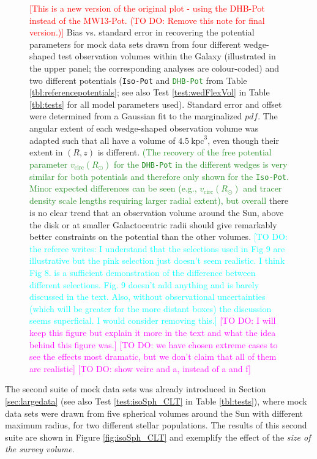 \documentclass[iop,revtex4]{emulateapj}
\newcommand{\pdf}{\ensuremath{pdf}}
\newcommand{\HW}[1]{\textcolor{Cyan}{#1}}
\newcommand{\NEW}[1]{\textcolor{ForestGreen}{#1}}
\newcommand{\Wilma}[1]{\textcolor{Magenta}{#1}}
\newcommand{\NOTE}[1]{\textcolor{Red}{#1}}
\newcommand{\OLD}[1]{}
\begin{document}
\begin{figure}[!htbp]
\caption{\NOTE{[This is a new version of the original plot - using the DHB-Pot instead of the MW13-Pot. (TO DO: Remove this note for final version.)]} Bias vs. standard error in recovering the potential parameters for mock data sets drawn from four different wedge-shaped test observation volumes within the Galaxy (illustrated in the upper panel; the corresponding analyses are colour-coded) and two different potentials (\texttt{Iso-Pot} and \OLD{\texttt{MW13-Pot}}\NEW{\texttt{DHB-Pot}} from Table \ref{tbl:referencepotentials}; see also Test \ref{test:wedFlexVol} in Table \ref{tbl:tests} for all model parameters used). Standard error and offset were determined from a Gaussian fit to the marginalized \pdf{}. The angular extent of each wedge-shaped observation volume was adapted such that all have a volume of $4.5~\text{kpc}^3$, even though their extent in $(R,z)$ is different. \NEW{(The recovery of the free potential parameter $v_\text{circ}(R_\odot)$ for the \texttt{DHB-Pot} in the different wedges is very similar for both potentials and therefore only shown for the \texttt{Iso-Pot}. Minor expected differences can be seen (e.g., $v_\text{circ}(R_\odot)$ and tracer density scale lengths requiring larger radial extent), but overall}\OLD{Overall} there is no clear trend that an observation volume around the Sun, above the disk or at smaller Galactocentric radii should give remarkably better constraints on the potential than the other volumes. \HW{[TO DO: the referee writes: I understand that the selections used in Fig 9 are illustrative but the pink selection just doesn't seem realistic. I think Fig 8. is a sufficient demonstration of the difference between different selections. Fig. 9 doesn't add anything and is barely discussed in the text. Also, without observational uncertainties (which will be greater for the more distant boxes) the discussion seems superficial. I would consider removing this.]} \Wilma{[TO DO: I will keep this figure but explain it more in the text and what the idea behind this figure was.]} \Wilma{[TO DO: we have chosen extreme cases to see the effects most dramatic, but we don't claim that all of them are realistic]} \Wilma{[TO DO: show vcirc and a, instead of a and f]}}
\label{fig:wedFlexVol_bias_vs_SE}
\end{figure}

The second suite of mock data sets was already introduced in Section \ref{sec:largedata} (see also Test \ref{test:isoSph_CLT} in Table \ref{tbl:tests}), where mock data sets were drawn from five spherical volumes around the Sun with different maximum radius, for two different stellar populations. The results of this second suite are shown in Figure \ref{fig:isoSph_CLT} and exemplify the effect of the {\it size of the survey volume}.
\end{document}
